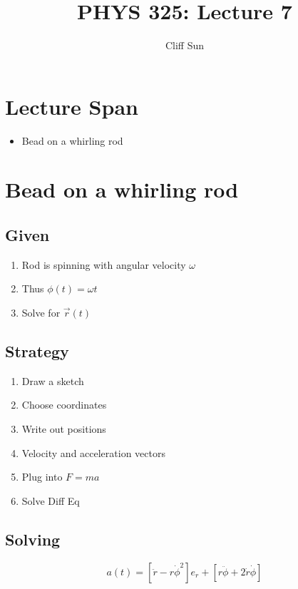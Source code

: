\documentclass{article}
\title{PHYS 325: Lecture 7}
\author{Cliff Sun}
\newtheorem{one minute paper}[theorem]{One Minute Paper}
\begin{document}
\maketitle

\section*{Lecture Span}
\begin{itemize}
    \item Bead on a whirling rod
\end{itemize}

\section*{Bead on a whirling rod}

\subsection*{Given}
\begin{enumerate}
    \item Rod is spinning with angular velocity $\omega$
    \item Thus $\phi(t) = \omega t$
    \item Solve for $\vec{r}(t)$
\end{enumerate}

\subsection*{Strategy}
\begin{enumerate}
    \item Draw a sketch
    \item Choose coordinates
    \item Write out positions
    \item Velocity and acceleration vectors
    \item Plug into $F = ma$
    \item Solve Diff Eq
\end{enumerate}

\subsection*{Solving}

\begin{equation}
    a(t) = \left[\ddot{r} - r\dot{\phi}^2\right]e_r + \left[r\ddot{\phi} + 2\dot{r}\dot{\phi}\right]
\end{equation}
\end{document}
